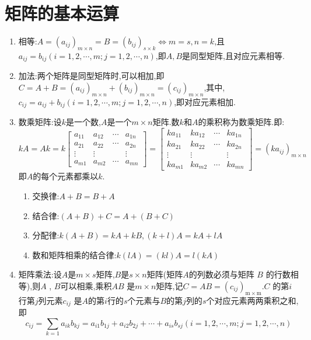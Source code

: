 \documentclass[8pt a4paper,oneside,UTF8]{ctexbook}
\begin{document}
\begin{sloppypar}
    \section{矩阵的基本运算}
    \begin{enumerate}
        \item 相等:$A= ( a_{ij}) _{m\times n}= B= ( b_{ij}) _{s\times k}\Leftrightarrow m= s,n= k$,且$a_{ij}=b_{ij}(i=1,2,\cdots,m;j=1,2,\cdots,n)$,即$A,B$是同型矩阵,且对应元素相等.
        \item 加法:两个矩阵是同型矩阵时,可以相加,即$C=A+B=\left(a_{ij}\right)_{m\times n}+\left(b_{ij}\right)_{m\times n}=\left(c_{ij}\right)_{m\times n}$,其中,$c_{ij}=a_{ij}+b_{ij}\left(i=1,2,\cdots,m;j=1,2,\cdots,n\right)$,即对应元素相加.
        \item 数乘矩阵:设$k$是一个数,$A$是一个$m \times n$矩阵.数$k$和$A$的乘积称为数乘矩阵.即:
              $$
                  kA=Ak=k\begin{bmatrix}a_{11}&a_{12}&\cdots&a_{1n}\\a_{21}&a_{22}&\cdots&a_{2n}\\\vdots&\vdots&&\vdots\\a_{m1}&a_{m2}&\cdots&a_{mn}\end{bmatrix}=\begin{bmatrix}ka_{11}&ka_{12}&\cdots&ka_{1n}\\ka_{21}&ka_{22}&\cdots&ka_{2n}\\\vdots&\vdots&&\vdots\\ka_{m1}&ka_{m2}&\cdots&ka_{mn}\end{bmatrix}=(ka_{ij})_{m \times n}
              $$即$A$的每个元素都乘以$k$.
              \begin{enumerate}
                  \item 交换律:$A+B=B+A$
                  \item 结合律:$(A+B)+C=A+(B+C)$
                  \item 分配律:$k(A+B)=kA+kB,(k+l)A=kA+lA$
                  \item 数和矩阵相乘的结合律:$k(lA)=(kl)A=l(kA)$
              \end{enumerate}
        \item 矩阵乘法:设$A$是$m \times s$矩阵,$B$是$s \times n$矩阵(矩阵$A$的列数必须与矩阵 $B$ 的行数相等),则$A$ , $B$可以相乘,乘积$AB$ 是$m\times n$矩阵,记$C=AB=(c_{ij})_\mathrm{m \times m}.C$ 的第$i$行第$j$列元素$c_{ij}$ 是$A$的第$i$行的$s$个元素与$B$的第$j$列的$s$个对应元素两两乘积之和,即$$c_{ij}=\sum_{k=1}a_{ik}b_{kj}=a_{i1}b_{1j}+a_{i2}b_{2j}+\cdots+a_{is}b_{sj}(i=1,2,\cdots,m; j=1, 2,\cdots, n)$$

\end{enumerate}
\end{sloppypar}
\end{document}
